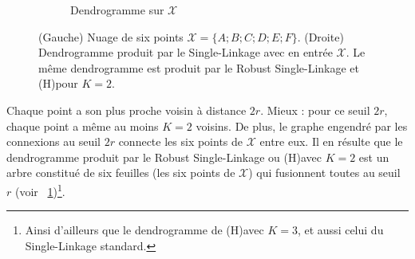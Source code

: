 \begin{figure}[htbp]
\begin{subfigure}[b]{0.48\textwidth}
        \caption{Dendrogramme sur $\mathcal X$}
        \label{fig:dendrogramme}
    \end{subfigure}
    
    \caption{(Gauche) Nuage de six points $\mathcal X = \bigl\{A ; B ; C ; D ; E ; F\bigr\}$. (Droite) Dendrogramme produit par le Single-Linkage avec en entrée $\mathcal X$. Le même dendrogramme est produit par le Robust Single-Linkage et (H)\DBSCAN pour $K=2$.}
    \label{fig:clustering}
\end{figure}

Chaque point a son plus proche voisin à distance $2r$. Mieux : pour ce seuil $2r$, chaque point a même au moins $K=2$ voisins. De plus, le graphe engendré par les connexions au seuil $2r$ connecte les six points de $\mathcal X$ entre eux. Il en résulte que le dendrogramme produit par le Robust Single-Linkage ou (H)\DBSCAN avec $K=2$ est un arbre constitué de six feuilles (les six points de $\mathcal X$) qui fusionnent toutes au seuil $r$ (voir \Fig~\ref{fig:dendrogramme})\footnote{Ainsi d'ailleurs que le dendrogramme de (H)\DBSCAN avec $K=3$, et aussi celui du Single-Linkage standard.}.

